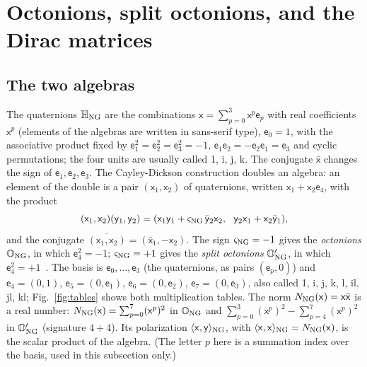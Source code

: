 \section{Octonions, split octonions, and the Dirac matrices}
\label{sec:octonions}

\subsection{The two algebras}

The quaternions $\mathbb H_{\rm NG}$ are the combinations $\mathsf x=\sum_{p=0}^3\mathsf x^p\mathsf e_p$ with real
coefficients $\mathsf x^p$ (elements of the algebras are written in sans-serif type), $\mathsf e_0=1$, with the associative product fixed by
$\mathsf e_1^2=\mathsf e_2^2=\mathsf e_3^2=-1$, $\mathsf e_1\mathsf e_2=-\mathsf e_2\mathsf e_1=\mathsf e_3$ and cyclic
permutations; the four units are usually called 1, i, j, k. The conjugate
$\bar{\mathsf x}$ changes the sign of $\mathsf e_1,\mathsf e_2,\mathsf e_3$. The Cayley-Dickson construction
doubles an algebra: an element of the double is a pair $(\mathsf x_1,\mathsf x_2)$ of quaternions,
written $\mathsf x_1+\mathsf x_2\mathsf e_4$, with the product
\begin{equation}
(\mathsf x_1,\mathsf x_2)(\mathsf y_1,\mathsf y_2)=(\mathsf x_1\mathsf y_1+\varsigma_{\rm NG}\,\bar{\mathsf y}_2\mathsf x_2,\ \
\mathsf y_2\mathsf x_1+\mathsf x_2\bar{\mathsf y}_1),
\label{eq:cd}
\end{equation}
and the conjugate $\overline{(\mathsf x_1,\mathsf x_2)}=(\bar{\mathsf x}_1,-\mathsf x_2)$. The sign
$\varsigma_{\rm NG}=-1$ gives the \emph{octonions} $\mathbb O_{\rm NG}$, in which $\mathsf e_4^2=-1$;
$\varsigma_{\rm NG}=+1$ gives the \emph{split octonions} $\mathbb O'_{\rm NG}$, in which
$\mathsf e_4^2=+1$~\cite{Schafer1966,Baez2002}. The basis is $\mathsf e_0,\dots,\mathsf e_3$ (the quaternions,
as pairs $(\mathsf e_p,0)$) and $\mathsf e_4=(0,1)$, $\mathsf e_5=(0,\mathsf e_1)$, $\mathsf e_6=(0,\mathsf e_2)$,
$\mathsf e_7=(0,\mathsf e_3)$, also called 1, i, j, k, l, il, jl, kl; Fig.~\ref{fig:tables} shows both
multiplication tables. The norm $N_{\rm NG}(\mathsf x)=\mathsf x\bar{\mathsf x}$ is a real number:
$N_{\rm NG}(\mathsf x)=\sum_{p=0}^7(\mathsf x^p)^2$ in $\mathbb O_{\rm NG}$ and $\sum_{p=0}^3(\mathsf x^p)^2-\sum_{p=4}^7(\mathsf x^p)^2$ in
$\mathbb O'_{\rm NG}$ (signature $4+4$). Its polarization $\langle\mathsf x,\mathsf y\rangle_{\rm NG}$, with
$\langle\mathsf x,\mathsf x\rangle_{\rm NG}=N_{\rm NG}(\mathsf x)$, is the scalar product of the algebra. (The
letter $p$ here is a summation index over the basis, used in this subsection only.)

